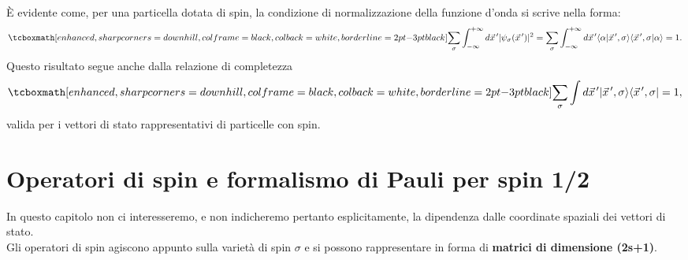 È evidente come, per una particella dotata di spin, la condizione di normalizzazione della funzione d'onda si scrive nella forma:
	\begin{equation}
		\tcboxmath[enhanced, sharp corners=downhill, colframe=black, colback=white, borderline={2pt}{-3pt}{black}]{
			\sum_{\sigma} \int_{-\infty}^{+\infty}d\vec{x}^{\, \prime}\vert\psi_{\sigma}(\vec{x}^{\, \prime})\vert^{2}=\sum_{\sigma} \int_{-\infty}^{+\infty}d\vec{x}^{\, \prime}\langle\alpha|\vec{x}^{\, \prime}, \sigma\rangle\langle\vec{x}^{\, \prime}, \sigma|\alpha\rangle=1 .
			}
	\end{equation}
Questo risultato segue anche dalla relazione di completezza
	\begin{equation}
		\tcboxmath[enhanced, sharp corners=downhill, colframe=black, colback=white, borderline={2pt}{-3pt}{black}]{
			\sum_{\sigma} \int d\vec{x}^{\, \prime}|\vec{x}^{\, \prime}, \sigma\rangle\langle\vec{x}^{\, \prime}, \sigma|=1 ,
			}
\end{equation}
valida per i vettori di stato rappresentativi di particelle con spin.
\section{Operatori di spin e formalismo di Pauli per spin 1/2}
In questo capitolo non ci interesseremo, e non indicheremo pertanto esplicitamente, la dipendenza dalle coordinate spaziali dei vettori di stato.\\

Gli operatori di spin agiscono appunto sulla varietà di spin $\sigma$ e si possono rappresentare in forma di \textbf{matrici di dimensione (2s+1)}.\\

